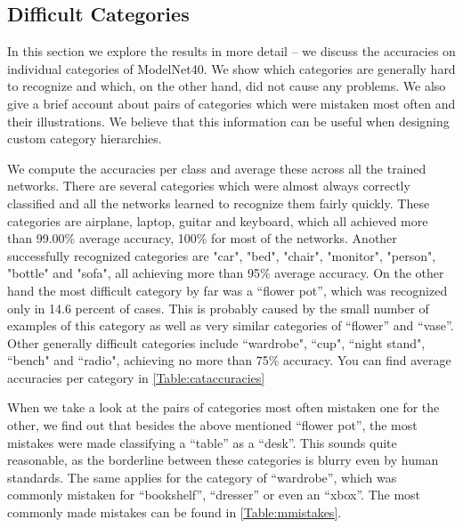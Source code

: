 \subsection{Difficult Categories}
In this section we explore the results in more detail -- we discuss the accuracies on individual categories of ModelNet40. We show which categories are generally hard to recognize and which, on the other hand, did not cause any problems. We also give a brief account about pairs of categories which were mistaken most often and their illustrations. We believe that this information can be useful when designing custom category hierarchies. \par
We compute the accuracies per class and average these across all the trained networks. There are several categories which were almost always correctly classified and all the networks learned to recognize them fairly quickly. These categories are airplane, laptop, guitar and keyboard, which all achieved more than 99.00\% average accuracy, 100\% for most of the networks. Another successfully recognized categories are "car", "bed", "chair", "monitor", "person", "bottle" and "sofa", all achieving more than 95\% average accuracy.  
On the other hand the most difficult category by far was a “flower pot”, which was recognized only in 14.6 percent of cases. This is probably caused by the small number of examples of this category as well as very similar categories of “flower” and “vase”. Other generally difficult categories include ``wardrobe", ``cup", ``night stand", ``bench" and ``radio", achieving no more than 75\% accuracy. You can find average accuracies per category in \autoref{Table:cataccuracies} \par



When we take a look at the pairs of categories most often mistaken one for the other, we find out that besides the above mentioned “flower pot”, the most mistakes were made classifying a “table” as a “desk”. This sounds quite reasonable, as the borderline between these categories is blurry even by human standards. The same applies for the category of “wardrobe”, which was commonly mistaken for “bookshelf”, “dresser” or even an “xbox”. The most commonly made mistakes can be found in \autoref{Table:mmistakes}.




